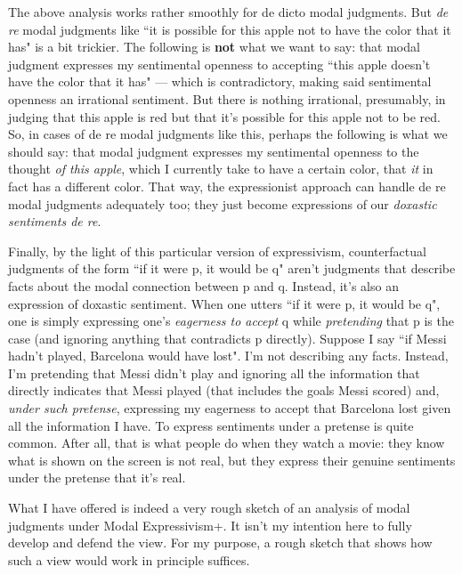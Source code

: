 \documentclass[a4paper,12pt]{article}
\begin{document}
The above analysis works rather smoothly for de dicto modal judgments. But \emph{de re} modal judgments like ``it is possible for this apple not to have the color that it has" is a bit trickier. The following is \textbf{not} what we want to say: that modal judgment expresses my sentimental openness to accepting ``this apple doesn't have the color that it has" --- which is contradictory, making said sentimental openness an irrational sentiment. But there is nothing irrational, presumably, in judging that this apple is red but that it's possible for this apple not to be red. So, in cases of de re modal judgments like this, perhaps the following is what we should say: that modal judgment expresses my sentimental openness to the thought \emph{of this apple}, which I currently take to have a certain color, that \emph{it} in fact has a different color. That way, the expressionist approach can handle de re modal judgments adequately too; they just become expressions of our \emph{doxastic sentiments de re}.

Finally, by the light of this particular version of expressivism, counterfactual judgments of the form ``if it were p, it would be q" aren't judgments that describe facts about the modal connection between p and q. Instead, it's also an expression of doxastic sentiment. When one utters ``if it were p, it would be q", one is simply expressing one's \emph{eagerness to accept} q while \emph{pretending} that p is the case (and ignoring anything that contradicts p directly). Suppose I say ``if Messi hadn't played, Barcelona would have lost". I'm not describing any facts. Instead, I'm pretending that Messi didn't play and ignoring all the information that directly indicates that Messi played (that includes the goals Messi scored) and, \emph{under such pretense}, expressing my eagerness to accept that Barcelona lost given all the information I have. To express sentiments under a pretense is quite common. After all, that is what people do when they watch a movie: they know what is shown on the screen is not real, but they express their genuine sentiments under the pretense that it's real.

What I have offered is indeed a very rough sketch of an analysis of modal judgments under Modal Expressivism+. It isn't my intention here to fully develop and defend the view. For my purpose, a rough sketch that shows how such a view would work in principle suffices.\footnotemark

\end{document}
